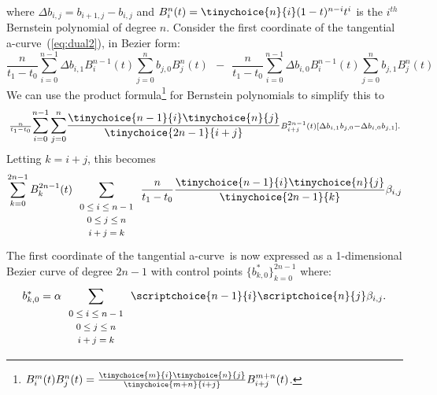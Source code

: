\documentclass[12pt]{article}
\newcommand{\atang}{tangential a-curve\ }
\begin{document}
where $\Delta b_{i,j} = b_{i+1,j} - b_{i,j}$ and
$B_i^n(t) = \tinychoice{n}{i} (1-t)^{n-i} t^i$ is the $i^{th}$ Bernstein
polynomial of degree $n$.
Consider the first coordinate of the \atang (\ref{eq:dual2}), in Bezier form:
\[
\scriptstyle{\frac{n}{t_1-t_0}}
\displaystyle{\sum_{i=0}^{n-1}} \scriptstyle{\Delta b_{i,1} B_i^{n-1}(t)}
\displaystyle{\sum_{j=0}^n}     \scriptstyle{       b_{j,0} B_j^n(t)}
\ \  - \ \ 
\scriptstyle{\frac{n}{t_1-t_0}}
\displaystyle{\sum_{i=0}^{n-1}} \scriptstyle{\Delta b_{i,0} B_i^{n-1}(t)}
\displaystyle{\sum_{j=0}^n}	\scriptstyle{       b_{j,1} B_j^n(t)}
\]
We can use the product formula\footnote{$B_i^m(t) B_j^n(t) = \frac{ \tinychoice{m}{i} \tinychoice{n}{j} }{ \tinychoice{m+n}{i+j} } B_{i+j}^{m+n}(t)$.}
for Bernstein polynomials \cite{farin97} to simplify this to
\[
\scriptstyle{\frac{n}{t_1-t_0}}
\displaystyle{\sum_{i=0}^{n-1} \sum_{j=0}^n }
\frac{\tinychoice{n-1}{i} \tinychoice{n}{j}}{ \tinychoice{2n-1}{i+j} } 
\scriptstyle{ B_{i+j}^{2n-1}(t) [ \Delta b_{i,1} b_{j,0} - \Delta b_{i,0} b_{j,1} ]}.
\]
Letting $k=i+j$, this becomes
\[
\sum_{k=0}^{2n-1} B_k^{2n-1}(t) 
\sum_{\begin{array}{c} \mbox{\footnotesize{$0 \leq i \leq n-1$}} \\ 
			     \mbox{\footnotesize{$0 \leq j \leq n$}} \\ 
			     \mbox{\footnotesize{$i+j=k$}}
			     \end{array}}
\frac{n}{t_1-t_0} \frac{ \tinychoice{n-1}{i} \tinychoice{n}{j} }{ \tinychoice{2n-1}{k} }
\beta_{i,j}
\]
The first coordinate of the \atang is now expressed as a 1-dimensional Bezier curve of 
degree $2n-1$ with control points $\{b^*_{k,0} \}_{k=0}^{2n-1}$ where:
\begin{equation}
\label{eq:dualw2}
b^*_{k,0} = \alpha
\sum_{\begin{array}{c} \mbox{\footnotesize{$0 \leq i \leq n-1$}} \\ 
			     \mbox{\footnotesize{$0 \leq j \leq n$}} \\ 
			     \mbox{\footnotesize{$i+j=k$}}
			     \end{array}}
\scriptchoice{n-1}{i} \scriptchoice{n}{j} \beta_{i,j}.
\end{equation}
\end{document}
